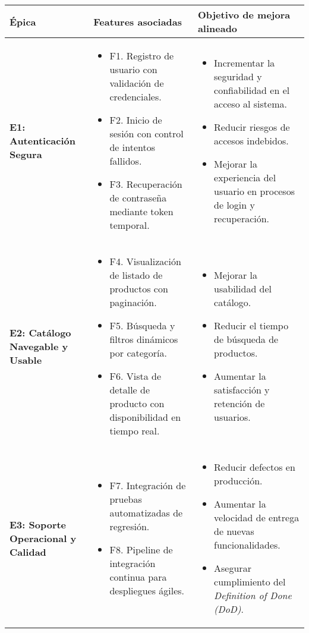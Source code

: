 \documentclass[11pt]{article}
\begin{document}
\begin{longtable}{>{\RaggedRight}p{3cm} >{\RaggedRight}p{5.5cm} >{\RaggedRight\arraybackslash}p{6cm}}
\toprule
\textbf{Épica} & \textbf{Features asociadas} & \textbf{Objetivo de mejora alineado} \\
\midrule
\textbf{E1: Autenticación Segura} & 
\begin{itemize}
  \item F1. Registro de usuario con validación de credenciales.
  \item F2. Inicio de sesión con control de intentos fallidos.
  \item F3. Recuperación de contraseña mediante token temporal.
\end{itemize}
&
\begin{itemize}
  \item Incrementar la seguridad y confiabilidad en el acceso al sistema.
  \item Reducir riesgos de accesos indebidos.
  \item Mejorar la experiencia del usuario en procesos de login y recuperación.
\end{itemize} \\
\midrule
\textbf{E2: Catálogo Navegable y Usable} &
\begin{itemize}
  \item F4. Visualización de listado de productos con paginación.
  \item F5. Búsqueda y filtros dinámicos por categoría.
  \item F6. Vista de detalle de producto con disponibilidad en tiempo real.
\end{itemize}
&
\begin{itemize}
  \item Mejorar la usabilidad del catálogo.
  \item Reducir el tiempo de búsqueda de productos.
  \item Aumentar la satisfacción y retención de usuarios.
\end{itemize} \\
\midrule
\textbf{E3: Soporte Operacional y Calidad} &
\begin{itemize}
  \item F7. Integración de pruebas automatizadas de regresión.
  \item F8. Pipeline de integración continua para despliegues ágiles.
\end{itemize}
&
\begin{itemize}
  \item Reducir defectos en producción.
  \item Aumentar la velocidad de entrega de nuevas funcionalidades.
  \item Asegurar cumplimiento del \emph{Definition of Done (DoD)}.
\end{itemize} \\
\bottomrule
\end{longtable}
\end{document}
